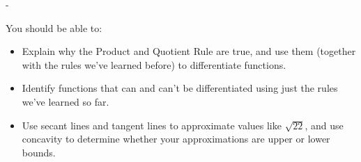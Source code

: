 \documentclass{article}
\makeatletter
\newlength{\tipmargin}
\renewenvironment{framed}{
  \setlength{\tipmargin}{\textwidth-\linewidth}
  \advance\@totalleftmargin-\tipmargin
  \def\FrameCommand{\hspace{\tipmargin}\fbox}%
  \advance\linewidth\tipmargin
  \MakeFramed {\advance\hsize-\width \FrameRestore}%
}
{\endMakeFramed}
\makeatother
\begin{document}

\begin{problemonly}
  \begin{framed}

You should be able to:
    \begin{itemize}[topsep=0pt,partopsep=0pt,parsep=8pt,itemsep=0pt]
    \item Explain why the Product and Quotient Rule are true, and use them (together with the rules we've learned before) to differentiate functions.

    \item Identify functions that can and can't be differentiated using just the rules we've learned so far.

    \item Use secant lines and tangent lines to approximate values like $\sqrt{22}$, and use concavity to determine whether your approximations are upper or lower bounds. 

    \end{itemize}
  \end{framed}
\end{problemonly}
\end{document}
